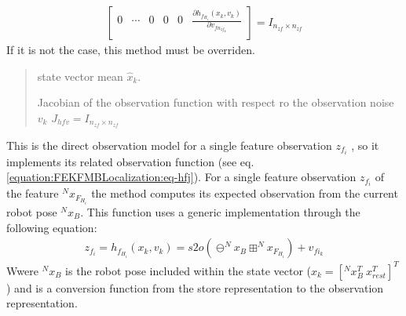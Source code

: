 \documentclass[letterpaper,10pt,english]{sphinxmanual}
\begin{document}
\begin{fulllineitems}
\begin{fulllineitems}
\begin{equation}
\begin{split}
\begin{bmatrix}
    0 & \cdots & 0 & 0 & 0 & \frac{\partial h_{f_{H_1}}(x_k,v_k)}{\partial v_{fn_{zf_k}}}  \\
\end{bmatrix}= I_{n_{zf}\times n_{zf}}\end{split}
\end{equation}
\sphinxAtStartPar
If it is not the case, this method must be overriden.
\begin{quote}\begin{description}
\sphinxAtStartPar
{} \textendash{} state vector mean \(\hat x_k\).

\sphinxAtStartPar
Jacobian of the observation function {\hyperref[\detokenize{FEKFMBLocalization:MapFeature.MapFeature.hf}]{}} with respect ro the observation noise \(v_k\) \(J_{hfv}=I_{n_{zf}\times n_{zf}}\)

\end{description}\end{quote}

\end{fulllineitems}


\begin{fulllineitems}
\label{\detokenize{FEKFMBLocalization:MapFeature.MapFeature.hfj}}
\pysigstartsignatures
{}
\pysigstopsignatures
\sphinxAtStartPar
This is the direct observation model for a single feature observation  \(z_{f_i}\) , so it implements its related
observation function (see eq. \eqref{equation:FEKFMBLocalization:eq-hfj}). For a single feature observation \(z_{f_i}\) of the feature \(^Nx_{F_{H_i}}\) the method computes its
expected observation from the current robot pose \(^Nx_B\).
This function uses a generic implementation through the following equation:
\begin{equation}\label{equation:FEKFMBLocalization:eq-hfj}
\begin{split}z_{f_i}=h_{f_{H_i}}(x_k,v_k)=s2o(\ominus ^Nx_B \boxplus ^Nx_{F_{H_i}}) + v_{fi_k}\end{split}
\end{equation}
\sphinxAtStartPar
Wwere \(^Nx_B\) is the robot pose included within the state vector (\(x_k=[^Nx_B^T~x_{rest}^T]^T\))  and {\hyperref[\detokenize{FEKFMBLocalization:MapFeature.MapFeature.s2o}]{}} is a conversion
function from the store representation to the observation representation.


\end{fulllineitems}
\end{fulllineitems}
\end{document}
